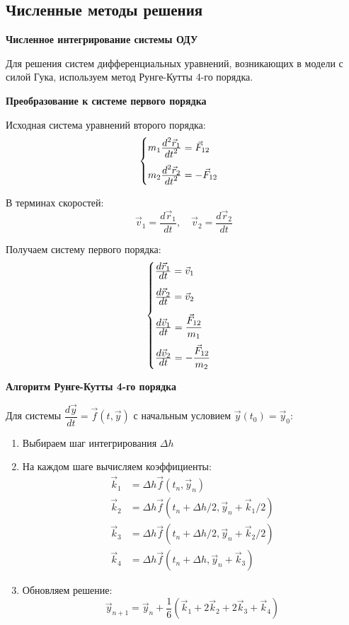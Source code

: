 \begin{center}
    \section{Численные методы решения}
\end{center}

\begin{center}
    \textbf{Численное интегрирование системы ОДУ}
\end{center}

Для решения систем дифференциальных уравнений, возникающих в модели с силой Гука, используем метод Рунге-Кутты 4-го порядка.

\begin{center}
    \textbf{Преобразование к системе первого порядка}
\end{center}

Исходная система уравнений второго порядка:
\[
\begin{cases}
m_1 \frac{\displaystyle d^2\vec{r}_1}{\displaystyle dt^2} = \vec{F}_{12} \\[1em]
m_2 \frac{\displaystyle d^2\vec{r}_2}{\displaystyle dt^2} = -\vec{F}_{12}
\end{cases}
\]

В терминах скоростей:
\[
\vec{v}_1 = \dfrac{d\vec{r}_1}{dt}, \quad \vec{v}_2 = \dfrac{d\vec{r}_2}{dt}
\]

Получаем систему первого порядка:
\[
\begin{cases}
\frac{\displaystyle d\vec{r}_1}{\displaystyle dt} = \vec{v}_1 \\[1em]
\frac{\displaystyle d\vec{r}_2}{\displaystyle dt} = \vec{v}_2 \\[1em]
\frac{\displaystyle d\vec{v}_1}{\displaystyle dt} = \dfrac{\vec{F}_{12}}{m_1} \\[1em]
\frac{\displaystyle d\vec{v}_2}{\displaystyle dt} = -\dfrac{\vec{F}_{12}}{m_2}
\end{cases}
\]

\begin{center}
    \textbf{Алгоритм Рунге-Кутты 4-го порядка}
\end{center}

Для системы $\dfrac{d\vec{y}}{dt} = \vec{f}(t, \vec{y})$ с начальным условием $\vec{y}(t_0) = \vec{y}_0$:

\begin{enumerate}
    \item Выбираем шаг интегрирования $\Delta h$
    \item На каждом шаге вычисляем коэффициенты:
    \begin{align}
    \vec{k}_1 &= \Delta h \vec{f}(t_n, \vec{y}_n) \\
    \vec{k}_2 &= \Delta h \vec{f}(t_n + \Delta h/2, \vec{y}_n + \vec{k}_1/2) \\
    \vec{k}_3 &= \Delta h \vec{f}(t_n + \Delta h/2, \vec{y}_n + \vec{k}_2/2) \\
    \vec{k}_4 &= \Delta h \vec{f}(t_n + \Delta h, \vec{y}_n + \vec{k}_3)
    \end{align}
    \item Обновляем решение:
    \[
    \vec{y}_{n+1} = \vec{y}_n + \dfrac{1}{6}(\vec{k}_1 + 2\vec{k}_2 + 2\vec{k}_3 + \vec{k}_4)
    \]
\end{enumerate}

